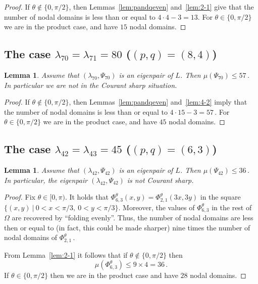 \documentclass[a4paper,reqno,11pt]{amsart}
\newtheorem{lemma}[thm]{Lemma}
\theoremstyle{remark}
\theoremstyle{definition}
\numberwithin{equation}{section}
\begin{document}
\begin{proof}
If $\theta\not\in\{0,\pi/2\}$, then Lemmas~\ref{lem:pandqeven} and~\ref{lem:2-1}
give that the number of nodal domains is less than or equal to 
$4\cdot 4-3=13$.
For $\theta\in\{0,\pi/2\}$ we are in the product case, and have $15$ nodal domains.
\end{proof}

\subsection{The case $\lambda_{70}=\lambda_{71}=80$ ($(p,q)=(8,4)$)}
\begin{lemma}
\label{lem:8-4}
Assume that $(\lambda_{70},\Psi_{70})$ is an eigenpair of $L$. Then
$\mu(\Psi_{70})\leq 57\,$.
In particular we are not in the Courant sharp situation.
\end{lemma}

\begin{proof}
If $\theta\not\in\{0,\pi/2\}$, then Lemmas~\ref{lem:pandqeven} and~\ref{lem:4-2}
imply that the number of nodal domains is less than or equal to 
$4\cdot 15-3=57\,$. For $\theta\in\{0,\pi/2\}$ we are in the product case, 
and have $45$ nodal domains.
\end{proof}

\subsection{The case $\lambda_{42}=\lambda_{43}=45$ ($(p,q)=(6,3)$)}
\begin{lemma}
\label{lem:6-3}
Assume that $(\lambda_{42},\Psi_{42})$ is an eigenpair of $L$. Then
$\mu(\Psi_{42})\leq 36\,$. In particular, the eigenpair $(\lambda_{42},\Psi_{42})$
is not Courant sharp.
\end{lemma}

\begin{proof}
Fix $\theta\in[0,\pi)$.
It holds that $\Phi_{6,3}^\theta(x,y)=\Phi_{2,1}^\theta(3x,3y)$ in the square
$\{(x,y)~|~0<x<\pi/3,\ 0<y<\pi/3\}$.  
Moreover, the values of $\Phi_{6,3}^\theta$ in the rest of $\Omega$ are 
recovered by ``folding evenly''. Thus, the number of nodal domains are less 
then or equal to (in fact, this could be made sharper) nine times the number of 
nodal domains of $\Phi_{2,1}^\theta\,$.

From Lemma~\ref{lem:2-1} it follows that if $\theta\not\in\{0,\pi/2\}$ then
\[
\mu(\Phi_{6,3}^\theta)\leq 9\times 4=36\,.
\]
If $\theta\in\{0,\pi/2\}$ then we 
are in the product case and have $28$ nodal domains.
\end{proof}
\end{document}
